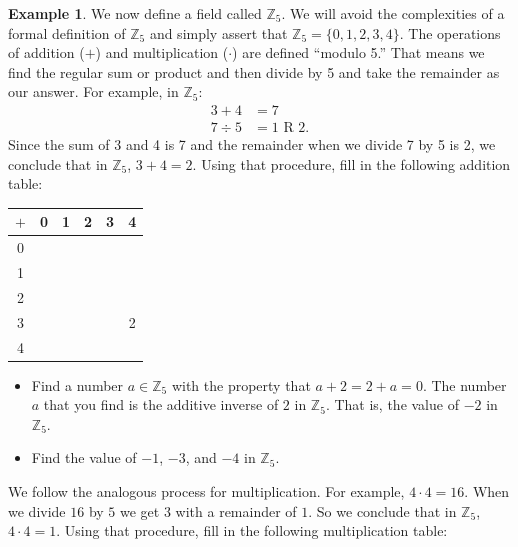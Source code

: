 \documentclass[11pt]{article}
\newenvironment{task}
	{\begin{mdframed}[linecolor=lightgray, linewidth=3pt]\raggedright}
	{\end{mdframed}}
\theoremstyle{definition}
\newtheorem{example}[theorem]{Example}
\begin{document}
\begin{example}
  We now define a field called $\mathbb{Z}_5$. We will avoid the complexities of a formal definition of $\mathbb{Z}_5$ and simply assert that 
  $\mathbb{Z}_5 = \{ 0, 1, 2, 3, 4\}$. The operations of addition ($+$) and multiplication ($\cdot$) are defined ``modulo 5.'' That means we find
  the regular sum or product and then divide by 5 and take the remainder as our answer. For example, in $\mathbb{Z}_5$:
  \begin{align*}
    3 + 4 &= 7\\
    7 \div 5 &= 1 \text{ R } 2.
  \end{align*}
  Since the sum of 3 and 4 is 7 and the remainder when we divide 7 by 5 is 2, we conclude that in $\mathbb{Z}_5$, $3 + 4 = 2$. Using that procedure, fill in
  the following addition table:

  \begin{center}
    \begin{tabular}{|c|c|c|c|c|c|}\\ \hline
      $+$ & 0 & 1 & 2 & 3 & 4 \\ \hline
      0   &   &   &   &   &   \\ \hline
      1   &   &   &   &   &   \\ \hline
      2   &   &   &   &   &   \\ \hline
      3   &   &   &   &   & 2 \\ \hline
      4   &   &   &   &   &   \\ \hline
    \end{tabular}
  \end{center}

  \begin{task}
    \begin{itemize}
      \item Find a number $a \in \mathbb{Z}_5$ with the property that $a + 2 = 2 + a = 0$. The number $a$ that you find is the additive inverse of $2$ in 
    $\mathbb{Z}_5$. That is, the value of $-2$ in $\mathbb{Z}_5$.
    \item Find the value of $-1$, $-3$, and $-4$ in $\mathbb{Z}_5$.
    \end{itemize}
  \end{task}

  We follow the analogous process for multiplication. For example, $4 \cdot 4 = 16$. When we divide $16$ by $5$ we get $3$ with a remainder of $1$. So we
  conclude that in $\mathbb{Z}_5$, $4 \cdot 4 = 1$. Using that procedure, fill in
  the following multiplication table:


\end{example}
\end{document}
